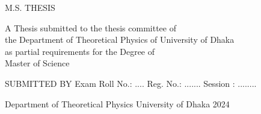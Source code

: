 {\begin{center}
            M.S. THESIS \\
             \vfill
          
              A Thesis submitted to the thesis committee of \\
              the Department of Theoretical Physics of University of Dhaka \\
              as partial requirements for the Degree of \\
              Master of Science
          
          
          
          
          
          
          \vfill 
          
              SUBMITTED BY 
              \vskip 0.3in  %
              Exam Roll No.: ....
              \vskip 0.1in  %
              Reg. No.: .......
              \vskip 0.1in  %
              Session : ........
              \vskip 0.1in  %
          
              Department of Theoretical Physics
              \vskip 0.1in  %
              University of Dhaka
              \vskip 0.1in  %
              2024
              \vfill\null 
        \end{center}
} %
\makeatother

\setlength{\parskip}{8pt plus2pt minus2pt}


\usepackage[raggedright, medium]{titlesec}